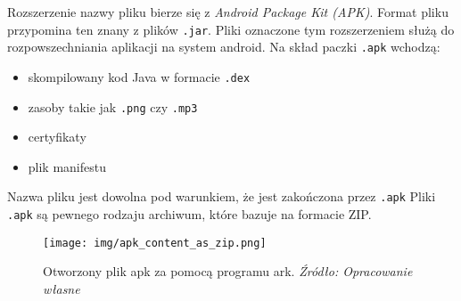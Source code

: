 \documentclass[12pt,a4paper,leqno,oneside,titlepage]{book}
\begin{document}
Rozszerzenie nazwy pliku bierze się z \emph{Android Package Kit (APK)}\cite{DexFormat,AndroidSourceDexFormat,HowAPK}.
Format pliku przypomina ten znany z plików \verb|.jar|.
Pliki oznaczone tym rozszerzeniem służą do rozpowszechniania aplikacji na system android. Na skład paczki \verb|.apk| wchodzą:
%
\begin{itemize}
\item skompilowany kod Java w formacie \verb|.dex|
\item zasoby takie jak \verb|.png| czy \verb|.mp3|
\item certyfikaty
\item plik manifestu
\end{itemize}
%
Nazwa pliku jest dowolna pod warunkiem, że jest zakończona przez \verb|.apk|
Pliki \verb|.apk| są pewnego rodzaju archiwum, które bazuje na formacie ZIP.
\begin{figure}[H]
	\centering
	\texttt{[image: img/apk\_content\_as\_zip.png]}
	\caption{Otworzony plik apk za pomocą programu ark. \emph{Źródło: Opracowanie własne}}
\end{figure}
%
\end{document}
